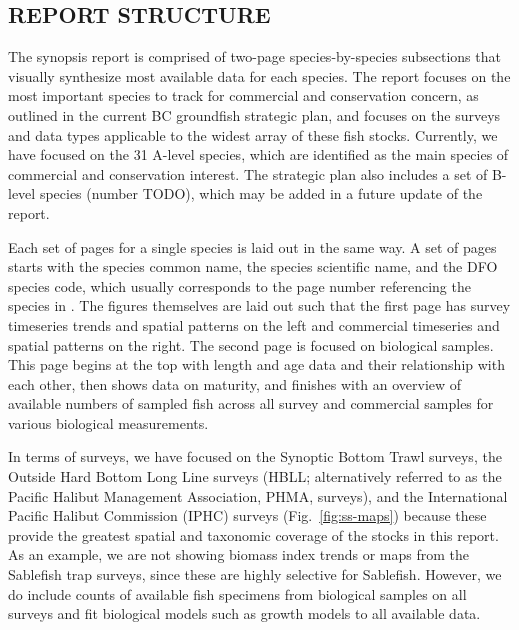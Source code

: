 \documentclass[11pt]{book}\usepackage[]{graphicx}\usepackage[]{color}
\begin{document}
\subsection{REPORT STRUCTURE}

The synopsis report is comprised of two-page species-by-species subsections that
visually synthesize most available data for each species. The report focuses on
the most important species to track for commercial and conservation concern, as
outlined in the current BC groundfish strategic plan, and focuses on the surveys
and data types applicable to the widest array of these fish stocks. Currently,
we have focused on the 31 A-level species, which are identified as the main species
of commercial and conservation interest. The strategic plan also includes a set
of B-level species (number TODO), which may be added in a future update of the report.


Each set of pages for a single species is laid out in the same way. A set of
pages starts with the species common name, the species scientific name, and the
DFO species code, which usually corresponds to the page number referencing the
species in \citet{hart1988}. The figures themselves are laid out such
that the first page has survey timeseries trends and spatial patterns on the
left and commercial timeseries and spatial patterns on the right. The second
page is focused on biological samples. This page begins at the top with length and age
data and their relationship with each other, then shows data on maturity, and
finishes with an overview of available numbers of sampled fish across all survey
and commercial samples for various biological measurements.

In terms of surveys, we have focused on the Synoptic Bottom Trawl surveys, the
Outside Hard Bottom Long Line surveys (HBLL; alternatively referred to as the
Pacific Halibut Management Association, PHMA, surveys), and the International
Pacific Halibut Commission (IPHC) surveys (Fig.~\ref{fig:ss-maps}) because these provide the greatest
spatial and taxonomic coverage of the stocks in this report. As an example, we
are not showing biomass index trends or maps from the Sablefish trap surveys,
since these are highly selective for Sablefish. However, we do include counts of
available fish specimens from biological samples on all surveys and fit
biological models such as growth models to all available data.
\end{document}
